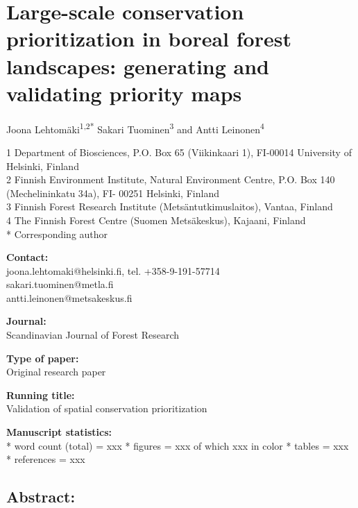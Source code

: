 \documentclass[]{article}
\begin{document}
\section{Large-scale conservation prioritization in boreal forest
landscapes: generating and validating priority maps}

Joona Lehtomäki\textsuperscript{1,2*} Sakari Tuominen\textsuperscript{3}
and Antti Leinonen\textsuperscript{4}

1 Department of Biosciences, P.O. Box 65 (Viikinkaari 1), FI-00014
University of Helsinki, Finland\\2 Finnish Environment Institute,
Natural Environment Centre, P.O. Box 140 (Mechelininkatu 34a), FI- 00251
Helsinki, Finland\\3 Finnish Forest Research Institute
(Metsäntutkimuslaitos), Vantaa, Finland\\4 The Finnish Forest Centre
(Suomen Metsäkeskus), Kajaani, Finland\\* Corresponding author

\textbf{Contact:}\\joona.lehtomaki@helsinki.fi, tel.
+358-9-191-57714\\sakari.tuominen@metla.fi\\antti.leinonen@metsakeskus.fi

\textbf{Journal:}\\Scandinavian Journal of Forest Research

\textbf{Type of paper:}\\Original research paper

\textbf{Running title:}\\Validation of spatial conservation
prioritization

\textbf{Manuscript statistics:}\\* word count (total) = xxx * figures =
xxx of which xxx in color * tables = xxx * references = xxx

\subsection{Abstract:}
\end{document}
